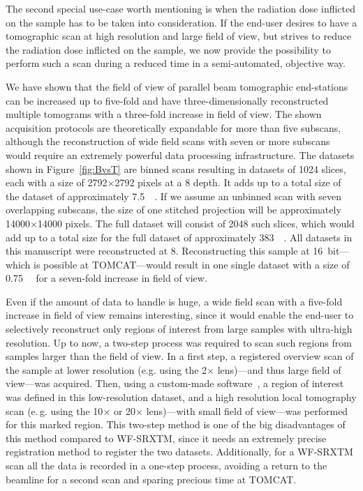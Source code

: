 \documentclass[preprint,s]{iucr}
\begin{document}
The second special use-case worth mentioning is when the radiation dose inflicted on the sample has to be taken into consideration. If the end-user desires to have a tomographic scan at high resolution and large field of view, but strives to reduce the radiation dose inflicted on the sample, we now provide the possibility to perform such a scan during a reduced time in a semi-automated, objective way.

We have shown that the field of view of parallel beam tomographic end-stations can be increased up to five-fold and have three-dimensionally reconstructed multiple tomograms with a three-fold increase in field of view. The shown acquisition protocols are theoretically expandable for more than five subscans, although the reconstruction of wide field scans with seven or more subscans would require an extremely powerful data processing infrastructure. The datasets shown in Figure~\ref{fig:BvsT} are binned scans resulting in datasets of 1024 slices, each with a size of 2792$\times$2792 pixels at a \SI{8}{\bit} depth. It adds up to a total size of the dataset of approximately \SI{7.5}{\giga\byte}. If we assume an unbinned scan with seven overlapping subscans, the size of one stitched projection will be approximately 14000$\times$14000 pixels. The full dataset will consist of 2048 such slices, which would add up to a total size for the full dataset of approximately \SI{383}{\giga\byte}. All datasets in this manuscript were reconstructed at \SI{8}{\bit}. Reconstructing this sample at \SI{16}{bit}---which is possible at TOMCAT---would result in one single dataset with a size of \SI{0.75}{\tera\byte} for a seven-fold increase in field of view.

Even if the amount of data to handle is huge, a wide field scan with a five-fold increase in field of view remains interesting, since it would enable the end-user to selectively reconstruct only regions of interest from large samples with ultra-high resolution. Up to now, a two-step process was required to scan such regions from samples larger than the field of view. In a first step, a registered overview scan of the sample at lower resolution (e.g. using the 2$\times$ lens)---and thus large field of view---was acquired. Then, using a custom-made software~\cite{Heinzer2008}, a region of interest was defined in this low-resolution dataset, and a high resolution local tomography scan (e.\,g. using the 10$\times$ or 20$\times$ lens)---with small field of view---was performed for this marked region. This two-step method is one of the big disadvantages of this method compared to WF-SRXTM, since it needs an extremely precise registration method to register the two datasets. Additionally, for a WF-SRXTM scan all the data is recorded in a one-step process, avoiding a return to the beamline for a second scan and sparing precious time at TOMCAT.
\end{document}
